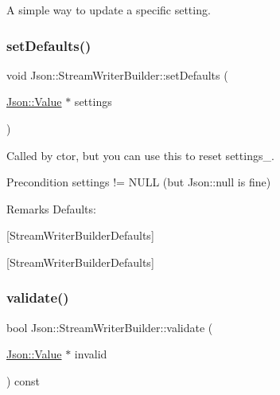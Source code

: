 A simple way to update a specific setting. \mbox{\label{classJson_1_1StreamWriterBuilder_a53bf106b141e28637b01ad0ecd2acbf6}} 
\subsubsection{\texorpdfstring{set\+Defaults()}{setDefaults()}}
{\footnotesize\ttfamily void Json\+::\+Stream\+Writer\+Builder\+::set\+Defaults (\begin{DoxyParamCaption}\item[{\hyperlink{classJson_1_1Value}{Json\+::\+Value} $\ast$}]{settings }\end{DoxyParamCaption})\hspace{0.3cm}{\ttfamily [static]}}

Called by ctor, but you can use this to reset settings\+\_\+. \begin{DoxyPrecond}{Precondition}
\textquotesingle{}settings\textquotesingle{} != N\+U\+LL (but Json\+::null is fine) 
\end{DoxyPrecond}
\begin{DoxyRemark}{Remarks}
Defaults\+: 
\begin{DoxyCodeInclude}
\end{DoxyCodeInclude}

\end{DoxyRemark}
\mbox{[}Stream\+Writer\+Builder\+Defaults\mbox{]}

\mbox{[}Stream\+Writer\+Builder\+Defaults\mbox{]} \mbox{\label{classJson_1_1StreamWriterBuilder_a12353b97766841db7d049da84658da09}} 
\subsubsection{\texorpdfstring{validate()}{validate()}}
{\footnotesize\ttfamily bool Json\+::\+Stream\+Writer\+Builder\+::validate (\begin{DoxyParamCaption}\item[{\hyperlink{classJson_1_1Value}{Json\+::\+Value} $\ast$}]{invalid }\end{DoxyParamCaption}) const}

